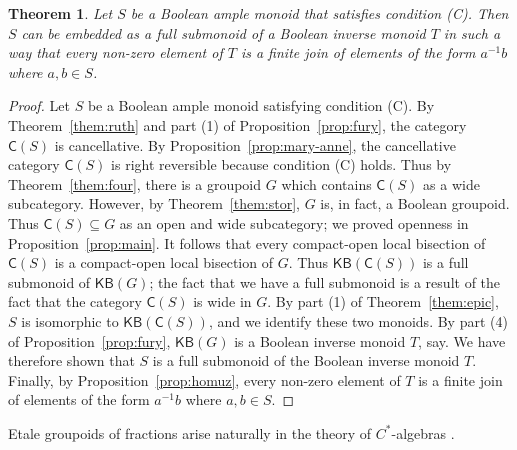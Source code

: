 \documentclass[a4paper]{amsart}
\newtheorem{theorem}{Theorem}[section]
\begin{document}
\begin{theorem}\label{them:vicky}
Let $S$ be a Boolean ample monoid that satisfies condition (C).
Then $S$ can be embedded as a full submonoid of a Boolean inverse monoid $T$
in such a way that every non-zero element of $T$ is a finite
join of elements of the form $a^{-1}b$ where $a,b \in S$.
\end{theorem}
\begin{proof} Let $S$ be a Boolean ample monoid satisfying condition (C).
By Theorem~\ref{them:ruth} and part (1) of Proposition~\ref{prop:fury}, the category $\mathsf{C}(S)$ is cancellative.
By Proposition~\ref{prop:mary-anne}, the cancellative category $\mathsf{C}(S)$ is right reversible because condition (C) holds.
Thus by Theorem~\ref{them:four}, there is a groupoid $G$ which contains $\mathsf{C}(S)$ as a wide subcategory.
However, by Theorem~\ref{them:stor}, $G$ is, in fact, a Boolean groupoid.
Thus $\mathsf{C}(S) \subseteq G$ as an open and wide subcategory;
we proved openness in Proposition~\ref{prop:main}.
It follows that every compact-open local bisection of $\mathsf{C}(S)$ is a compact-open local bisection of $G$.
Thus $\mathsf{KB}(\mathsf{C}(S))$ is a full submonoid of $\mathsf{KB}(G)$; 
the fact that we have a full submonoid is a result of the fact that the category $\mathsf{C}(S)$
is wide in $G$.
By part (1) of Theorem~\ref{them:epic}, $S$ is isomorphic to $\mathsf{KB}(\mathsf{C}(S))$, and we identify these two monoids.
By part (4) of Proposition~\ref{prop:fury},
$\mathsf{KB}(G)$ is a Boolean inverse monoid $T$, say.
We have therefore shown that $S$ is a full submonoid of the Boolean inverse monoid $T$.
Finally, by Proposition~\ref{prop:homuz}, every  non-zero element of $T$ is a finite
join of elements of the form $a^{-1}b$ where $a,b \in S$.
\end{proof}


Etale groupoids of fractions  arise naturally in the theory of $C^{\ast}$-algebras \cite{RW}.
\end{document}
